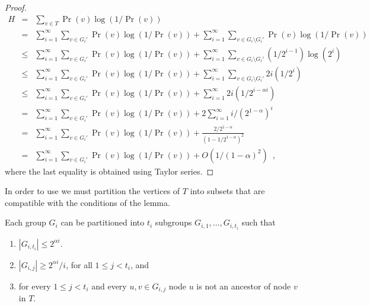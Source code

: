 \documentclass[charterfonts,lotsofwhite]{patmorin}
\newcommand{\blah}{O(1/(1-\alpha)^2)}
\begin{document}
\begin{proof}
\begin{eqnarray*}
   H & = & \sum_{v\in T} \Pr(v)\log(1/\Pr(v)) \\
   & = & \sum_{i=1}^{\infty}\sum_{v\in G_i'} \Pr(v)\log (1/\Pr(v)) +
         \sum_{i=1}^{\infty}\sum_{v\in G_i\setminus G_i'} \Pr(v)\log (1/\Pr(v)) \\
   & \le & \sum_{i=1}^{\infty}\sum_{v\in G_i'} \Pr(v)\log (1/\Pr(v)) +
         \sum_{i=1}^{\infty}\sum_{v\in G_i\setminus G_i'} (1/2^{i-1})\log (2^i) \\
   & \le & \sum_{i=1}^{\infty}\sum_{v\in G_i'} \Pr(v)\log (1/\Pr(v)) +
         \sum_{i=1}^{\infty}\sum_{v\in G_i\setminus G_i'} 2i(1/2^{i}) \\
   & \le & \sum_{i=1}^{\infty}\sum_{v\in G_i'} \Pr(v)\log (1/\Pr(v)) +
         \sum_{i=1}^{\infty} 2i(1/2^{i-\alpha i}) \\
   & = & \sum_{i=1}^{\infty}\sum_{v\in G_i'} \Pr(v)\log (1/\Pr(v)) +
         2\sum_{i=1}^{\infty} i/(2^{1-\alpha})^{i} \\
   & = & \sum_{i=1}^{\infty}\sum_{v\in G_i'} \Pr(v)\log (1/\Pr(v)) 
        + \frac{2/2^{1-\alpha}}{(1-1/2^{1-\alpha})^2} \\
   & = & \sum_{i=1}^{\infty}\sum_{v\in G_i'} \Pr(v)\log (1/\Pr(v)) + \blah
	\enspace ,
\end{eqnarray*}
where the last equality is obtained using Taylor series.
\end{proof}

In order to use  we must partition the vertices of
$T$ into subsets that are compatible with the conditions of the lemma.

\begin{lem}
Each group $G_i$ can be partitioned into $t_i$ subgroups
$G_{i,1},\ldots,G_{i,t_i}$ such that
\begin{enumerate}
\item $|G_{i,t_i}|\le 2^{\alpha i}$.

\item $|G_{i,j}| \ge 2^{\alpha i} / i$, for all $1\le j< t_i$, and

\item for every $1\le j< t_i$ and every $u,v\in G_{i,j}$ node $u$ is
not an ancestor of node $v$ in $T$. 

\end{enumerate}
\end{lem}
\end{document}
